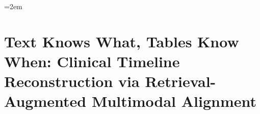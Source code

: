\begingroup
\ChEightBegin
\emergencystretch=2em
\chapter{Text Knows What, Tables Know When: Clinical Timeline Reconstruction via Retrieval-Augmented Multimodal Alignment}\label{chap:ch08}

% 





% 

\clearpage
\endgroup
